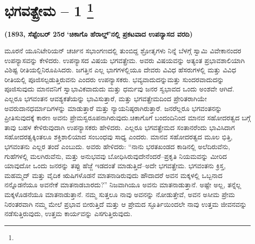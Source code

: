 
\vspace{-0.6cm}

\chapter[ಭಗವತ್ಪ್ರೇಮ – ೧ ]{ಭಗವತ್ಪ್ರೇಮ – 1 \protect\footnote{}}

\vskip 6pt

\vskip 6pt

\centerline{\textbf{(1893, ಸೆಪ್ಟೆಂಬರ್​ 25ರ ‘ಚಿಕಾಗೊ ಹೆರಾಲ್ಡ್​’ನಲ್ಲಿ ಪ್ರಕಟವಾದ ಉಪನ್ಯಾಸದ ವರದಿ)}}

\vskip 6pt

\vskip 6pt

ಮೂರನೆ ಯೂನಿಟೇರಿಯನ್​ ಚರ್ಚಿನ ಸಭಾಂಗಣದಲ್ಲಿ ತುಂಬಿದ್ದ ಶ್ರೋತೃಗಳು ನಿನ್ನೆ ಬೆಳಗ್ಗೆ ಸ್ವಾಮಿ ವಿವೇಕಾನಂದರ ಉಪನ್ಯಾಸವನ್ನು ಕೇಳಿದರು. ಉಪನ್ಯಾಸದ ವಿಷಯ ಭಗವತ್ಪ್ರೇಮ. ಅವರು ವಿಷಯವನ್ನು ಅತ್ಯಂತ ಪ್ರಭಾವಶಾಲಿಯಾಗಿ ವಿಶಿಷ್ಟ ರೀತಿಯಲ್ಲಿ\break ನಿರೂಪಿಸಿದರು. ಜಗತ್ತಿನ ಎಲ್ಲ ಭಾಗಗಳಲ್ಲಿಯೂ ದೇವರು ವಿವಿಧ ಹೆಸರುಗಳಲ್ಲಿ ಮತ್ತು ವಿವಿಧ ರೀತಿಯಲ್ಲಿ ಪೂಜಿಸಲ್ಪಡುತ್ತಿರುವನು ಎಂದರು ಉಪನ್ಯಾಸಕರು. ಭವ್ಯವಾದುದನ್ನು\break ಮತ್ತು ಸುಂದರವಾದುದನ್ನು ಪೂಜಿಸುವುದು ಮಾನವನಿಗೆ ಸ್ವಾಭಾವಿಕವಾದುದು ಮತ್ತು ಧರ್ಮವು ಜನರ ಸ್ವಭಾವದ ಒಂದು ಅಂಶವೇ ಆಗಿದೆ. ಎಲ್ಲರೂ ಭಗವಂತನ ಆವಶ್ಯ\-ಕತೆಯನ್ನು ಭಾವಿಸುತ್ತಾರೆ, ಮತ್ತು ಭಗವತ್ಪ್ರೇಮದಿಂದ ಪ್ರೇರಿತರಾಗಿಯೇ ಅವರು\break ದಾನಧರ್ಮಾದಿಗಳನ್ನು ಮಾಡುತ್ತಾರೆ ಮತ್ತು ನ್ಯಾಯನಿಷ್ಠರಾಗಿರುತ್ತಾರೆ. ಜನರೆಲ್ಲರೂ ಭಗವಂತನನ್ನು ಪ್ರೀತಿಸುವುದಕ್ಕೆ ಕಾರಣ ಅವನು ಪ್ರೇಮಸ್ವರೂಪನಾಗಿರುವುದು.\break ಚಿಕಾಗೊಗೆ ಬಂದಂದಿನಿಂದ ಮಾನವ ಸಹೋದರತ್ವದ ಬಗ್ಗೆ ತಾವು ಬಹಳ ಕೇಳಿರುವುದಾಗಿ ಉಪನ್ಯಾಸಕರು ಹೇಳಿದರು. ಎಲ್ಲರೂ ಭಗವತ್ಪ್ರೇಮದ ಸಂತಾನರೆಂದು ಭಾವಿಸಿದಾಗ ಸಹೋದರತ್ವಕ್ಕಿಂತಲೂ ಶಕ್ತಿಶಾಲಿಯಾದ ಸಂಬಂಧವು ಸಾಧ್ಯ ಎಂದರು. ಮಾನವ ಸಹೋದರತ್ವದ ಮೂಲ ಭಿತ್ತಿ, ಭಗವಂತನು ಎಲ್ಲರ ತಂದೆ ಎಂಬುದು. ಅವರು ಹೇಳಿದರು: “ನಾನು ಭರತಖಂಡದ ಕಾಡಿನಲ್ಲಿ ಅಲೆದಿರುವೆನು, ಗುಹೆಗಳಲ್ಲಿ ಮಲಗಿರುವೆನು, ಮತ್ತು ಅನುಭವವು ಬೋಧಿಸಿರುವುದೇನೆಂದರೆ–ಪ್ರಕೃತಿ ನಿಯಮವನ್ನು ಮೀರಿದ ಯಾವುದೋ ಒಂದು ಜನರನ್ನು ತಪ್ಪು ಹೆಜ್ಜೆ ಇಡದಂತೆ ಮಾಡುತ್ತಿದೆ–ಅದೇ ಭಗವತ್ಪ್ರೇಮ. ಭಗವಂತನು ಕ್ರಿಸ್ತ, ಮಹಮ್ಮದ್​ ಮತ್ತು ವೈದಿಕ ಋಷಿಗಳೊಡನೆ ಮಾತನಾಡಿರುವುದು ಹೌದಾದರೆ ಅವನ ಮಕ್ಕಳಲ್ಲಿ ಒಬ್ಬನಾದ ನನ್ನೊಡನೆಯೂ ಅವನೇಕೆ ಮಾತನಾಡಬಾರದು?” ನಿಜವಾಗಿಯೂ ಅವನು ಮಾತನಾಡುತ್ತಾನೆ. ಅಷ್ಟೇ ಅಲ್ಲ, ತನ್ನೆಲ್ಲ ಮಕ್ಕಳೊಡನೆಯೂ ಮಾತನಾಡುತ್ತಾನೆ. ನಮ್ಮ ಸುತ್ತಲೂ ನಾವು ಅವನನ್ನು ನೋಡುತ್ತೇವೆ, ಅವನ ಅಸೀಮ ಪ್ರೇಮ ನಿರಂತರವಾಗಿ ನಮ್ಮ ಮೇಲೆ ಪ್ರಭಾವ ಬೀರುತ್ತಿದೆ ಮತ್ತು ಆ ಪ್ರೇಮದ ಸ್ಫೂರ್ತಿಯಿಂದಲೇ ನಾವು ಉತ್ತಮ ಜೀವನವನ್ನು ನಡೆಸುತ್ತಿರುವುದು, ಉತ್ತಮ ಕಾರ್ಯವನ್ನು ಎಸಗುತ್ತಿರುವುದು.

